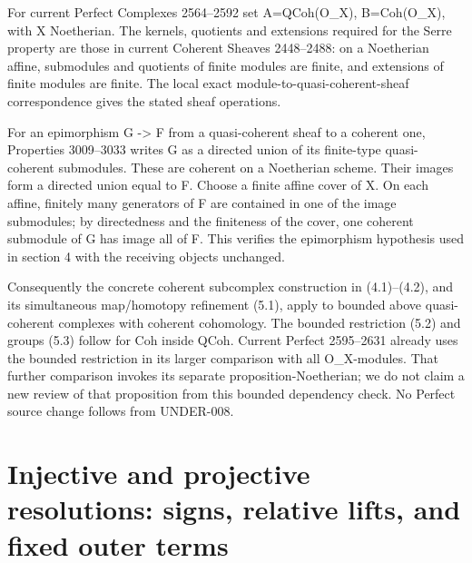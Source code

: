 \documentclass[11pt]{article}
\begin{document}
For current Perfect Complexes 2564–\allowbreak{}2592 set A\allowbreak{}=QCoh(O\_\allowbreak{}X)\allowbreak{},\allowbreak{} B\allowbreak{}=Coh(O\_\allowbreak{}X)\allowbreak{},\allowbreak{} with X Noetherian. The kernels,\allowbreak{} quotients and extensions required for the Serre property are those in current Coherent Sheaves 2448–\allowbreak{}2488:\allowbreak{} on a Noetherian affine,\allowbreak{} submodules and quotients of finite modules are finite,\allowbreak{} and extensions of finite modules are finite. The local exact module-to-quasi-coherent-sheaf correspondence gives the stated sheaf operations.

For an epimorphism G \allowbreak{}-> F from a quasi-coherent sheaf to a coherent one,\allowbreak{} Properties 3009–\allowbreak{}3033 writes G as a directed union of its finite-type quasi-coherent submodules. These are coherent on a Noetherian scheme. Their images form a directed union equal to F. Choose a finite affine cover of X. On each affine,\allowbreak{} finitely many generators of F are contained in one of the image submodules; by directedness and the finiteness of the cover,\allowbreak{} one coherent submodule of G has image all of F. This verifies the epimorphism hypothesis used in section 4 with the receiving objects unchanged.

Consequently the concrete coherent subcomplex construction in (4.1)\allowbreak{}–\allowbreak{}(4.2)\allowbreak{},\allowbreak{} and its simultaneous map/\allowbreak{}homotopy refinement (5.1)\allowbreak{},\allowbreak{} apply to bounded above quasi-coherent complexes with coherent cohomology. The bounded restriction (5.2)\allowbreak{} and groups (5.3)\allowbreak{} follow for Coh inside QCoh. Current Perfect 2595–\allowbreak{}2631 already uses the bounded restriction in its larger comparison with all O\_\allowbreak{}X-modules. That further comparison invokes its separate proposition-Noetherian; we do not claim a new review of that proposition from this bounded dependency check. No Perfect source change follows from UNDER-008.
\clearpage
\section{\texorpdfstring{Injective and projective resolutions:\allowbreak{} signs,\allowbreak{} relative lifts,\allowbreak{} and fixed outer terms}{Injective and projective   relative  and fixed outer terms}}\label{proofs-6209-7089-injective-and-projective-resolutions-signs-relative-lifts-and-fixed-outer-terms}
\end{document}
